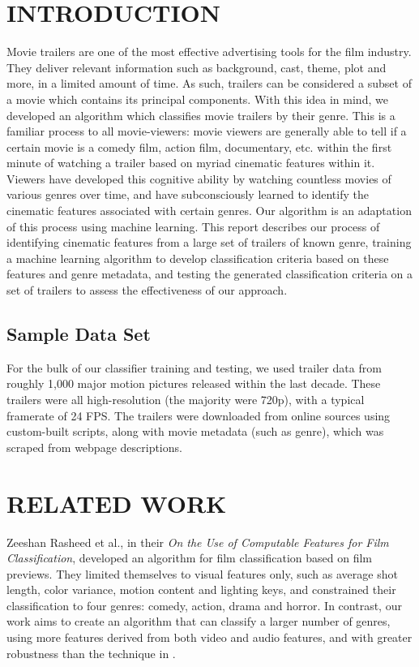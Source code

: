 \documentclass[letterpaper, 10 pt, conference]{ieeeconf}  %
\begin{document}
\section{INTRODUCTION}
Movie trailers are one of the most effective advertising tools for the film industry. They deliver relevant information such as background, cast, theme, plot and more, in a limited amount of time. As such, trailers can be considered a subset of a movie which contains its principal components. With this idea in mind, we developed an algorithm which classifies movie trailers by their genre. This is a familiar process to all movie-viewers: movie viewers are generally able to tell if a certain movie is a comedy film, action film, documentary, etc. within the first minute of watching a trailer based on myriad cinematic features within it. Viewers have developed this cognitive ability by watching countless movies of various genres over time, and have subconsciously learned to identify the cinematic features associated with certain genres. Our algorithm is an adaptation of this process using machine learning. This report describes our process of identifying cinematic features from a large set of trailers of known genre, training a machine learning algorithm to develop classification criteria based on these features and genre metadata, and testing the generated classification criteria on a set of trailers to assess the effectiveness of our approach.

\subsection{Sample Data Set}

For the bulk of our classifier training and testing, we used trailer data from roughly 1,000 major motion pictures released within the last decade. These trailers were all high-resolution (the majority were 720p), with a typical framerate of 24 FPS. The trailers were downloaded from online sources using custom-built scripts, along with movie metadata (such as genre), which was scraped from webpage descriptions.

\section{RELATED WORK}
Zeeshan Rasheed et al., in their \textit{On the Use of Computable Features for Film Classification}\cite{Rasheed}, developed an algorithm for film classification based on film previews. They limited themselves to visual features only, such as average shot length, color variance, motion content and lighting keys, and constrained their classification to four genres: comedy, action, drama and horror. In contrast, our work aims to create an algorithm that can classify a larger number of genres, using more features derived from both video and audio features, and with greater robustness than the technique in \cite{Rasheed}.
\end{document}
